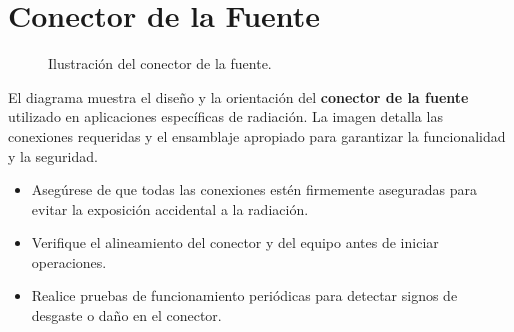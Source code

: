 \section*{Conector de la Fuente}

\begin{figure}[h!]
    \centering
    \caption{Ilustración del conector de la fuente.}
    \label{fig:conector-fuente}
\end{figure}

\noindent El diagrama muestra el diseño y la orientación del \textbf{conector de la fuente} utilizado en aplicaciones específicas de radiación. La imagen detalla las conexiones requeridas y el ensamblaje apropiado para garantizar la funcionalidad y la seguridad.

\begin{itemize}
    \item Asegúrese de que todas las conexiones estén firmemente aseguradas para evitar la exposición accidental a la radiación.
    \item Verifique el alineamiento del conector y del equipo antes de iniciar operaciones.
    \item Realice pruebas de funcionamiento periódicas para detectar signos de desgaste o daño en el conector.
\end{itemize}
